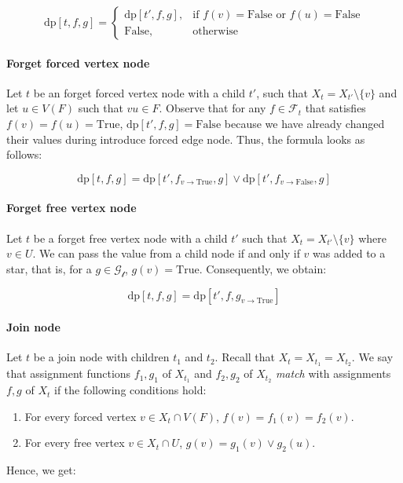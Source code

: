 \documentclass[en]{pracamgr}
\theoremstyle{definition}
\newcommand{\dpt}[1]{\textrm{dp}[#1]}
\newcommand{\true}{\textrm{True}}
\newcommand{\false}{\textrm{False}}
\begin{document}
\begin{equation*}
	\dpt{t,f,g} =
	\begin{cases}
		\dpt{t',f,g}, & \text{if $f(v)=\false$ or $f(u)=\false$} \\
		\false, & \text{otherwise}
	\end{cases}
\end{equation*}

\paragraph{Forget forced vertex node} Let $t$ be an forget forced vertex node with a child $t'$, such that $X_t = X_{t'} \setminus \{v\}$ and let $u \in V(F)$ such that $vu \in F$. Observe that for any $f \in \mathcal{F}_t$ that satisfies $f(v)=f(u)=\true$, $\dpt{t',f,g} = \false$ because we have already changed their values during introduce forced edge node. Thus, the formula looks as follows:

\begin{equation*}
	\dpt{t,f,g} = \dpt{t',f_{v \rightarrow \true},g} \lor \dpt{t',f_{v \rightarrow \false},g}
\end{equation*}

\paragraph{Forget free vertex node} Let $t$ be a forget free vertex node with a child $t'$ such that $X_t = X_{t'} \setminus \{v\}$ where $v \in U$. We can pass the value from a child node if and only if $v$ was added to a star, that is, for a $g \in \mathcal{G_t}$, $g(v)=\true$. Consequently, we obtain:

\begin{equation*}
	\dpt{t,f,g} = \dpt{t',f,g_{v \rightarrow \true}}
\end{equation*}

\paragraph{Join node} Let $t$ be a join node with children $t_1$ and $t_2$. Recall that $X_t=X_{t_1}=X_{t_2}$. We say that assignment functions $f_1,g_1$ of $X_{t_1}$ and $f_2,g_2$ of $X_{t_2}$ \textit{match} with assignments $f,g$ of $X_t$ if the following conditions hold:

\begin{enumerate}
	\item For every forced vertex $v \in X_t \cap V(F)$, $f(v)=f_1(v)=f_2(v)$.
	\item For every free vertex $v \in X_t \cap U$, $g(v)=g_1(v) \lor g_2(u)$.
\end{enumerate}
Hence, we get:
\end{document}
